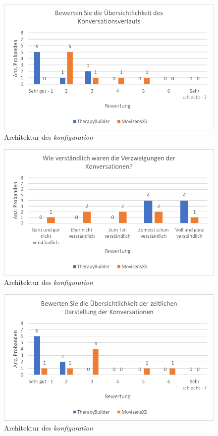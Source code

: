 \begin{figure}[h]
\centering
\includegraphics[width=1\textwidth]{pictures/diagramme/konversationverlfueber}
\caption{Architektur des \emph{konfiguration}}
\label{konversationverlfueber}
\end{figure}

\begin{figure}[h]
\centering
\includegraphics[width=1\textwidth]{pictures/diagramme/konversationverzweigung}
\caption{Architektur des \emph{konfiguration}}
\label{konversationverzweigung}
\end{figure}

\begin{figure}[h]
\centering
\includegraphics[width=1\textwidth]{pictures/diagramme/konversationzeitldarstellung}
\caption{Architektur des \emph{konfiguration}}
\label{konversationzeitldarstellung}
\end{figure}

